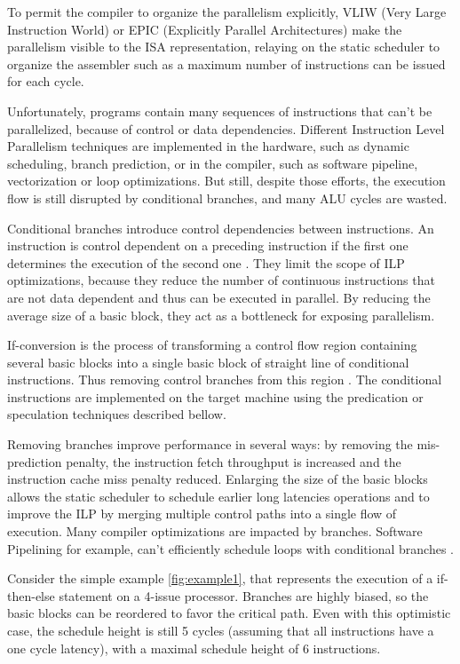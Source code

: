 To permit the compiler to organize the parallelism explicitly, VLIW (Very Large Instruction World) or EPIC (Explicitly Parallel Architectures) make the parallelism visible to the ISA representation, relaying on the static scheduler to organize the assembler such as a maximum number of instructions can be issued for each cycle. 


Unfortunately, programs contain many sequences of instructions that can't be parallelized, because of control or data dependencies. Different Instruction Level Parallelism techniques are implemented in the hardware, such as dynamic scheduling, branch prediction, or in the compiler, such as software pipeline, vectorization or loop optimizations. But still, despite those efforts, the execution flow is still disrupted by conditional branches, and many ALU cycles are wasted. 

Conditional branches introduce control dependencies between instructions. An instruction is control dependent on a preceding instruction if the first one determines the execution of the second one \cite{Kennedy:2001:OCM:502981}. They limit the scope of ILP optimizations, because they reduce the number of continuous instructions that are not data dependent and thus can be executed in parallel. By reducing the average size of a basic block, they act as a bottleneck for exposing parallelism.

If-conversion is the process of transforming a control flow region containing several basic blocks into a single basic block of straight line of conditional instructions. Thus removing control branches from this region \cite{Schlansker97achievinghigh}. The conditional instructions are implemented on the target machine using the predication or speculation techniques described bellow. 

Removing branches improve performance in several ways: by removing the mis-prediction penalty, the instruction fetch throughput is increased and the instruction cache miss penalty reduced. Enlarging the size of the basic blocks allows the static scheduler to schedule earlier long latencies operations and to improve the ILP by merging multiple control paths into a single flow of execution. Many compiler optimizations are impacted by branches. Software Pipelining for example, can't efficiently schedule loops with conditional branches \cite{Warter:1992:EMS:144953.145796}.

Consider the simple example \ref{fig:example1}, that represents the execution of a if-then-else statement on a 4-issue processor. Branches are highly biased, so the basic blocks can be reordered to favor the critical path. Even with this optimistic case, the schedule height is still 5 cycles (assuming that all instructions have a one cycle latency), with a maximal schedule height of 6 instructions. 

